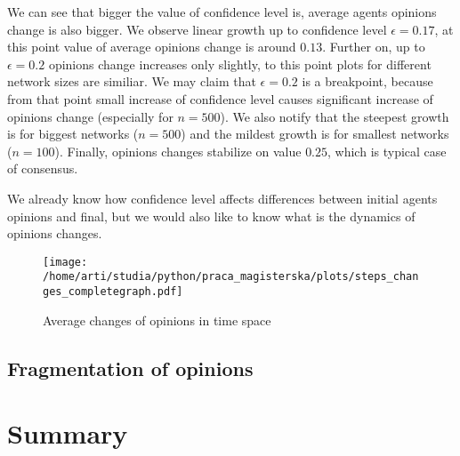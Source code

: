 \documentclass{article}
\begin{document}
We can see that bigger the value of confidence level is, average agents opinions change is also bigger. We observe linear growth up to confidence level $\epsilon=0.17$, at this point value of average opinions change is around $0.13$. Further on, up to $\epsilon=0.2$ opinions change increases only slightly, to this point plots for different network sizes are similiar. We may claim that $\epsilon=0.2$ is a breakpoint, because from that point small increase of confidence level causes significant increase of opinions change (especially for $n=500$). We also notify that the steepest growth is for biggest networks ($n=500$) and the mildest growth is for smallest networks ($n=100$). Finally, opinions changes stabilize on value $0.25$, which is typical case of consensus.

\indent

We already know how confidence level affects differences between initial agents opinions and final, but we would also like to know what is the dynamics of opinions changes.

\begin{figure}[H]
		\centering
		\texttt{[image: /home/arti/studia/python/praca\_magisterska/plots/steps\_changes\_completegraph.pdf]}
		\caption{Average changes of opinions in time space}
\end{figure}



\subsection{Fragmentation of opinions}

\section{Summary}
\indent
\end{document}
